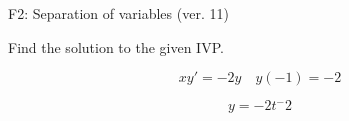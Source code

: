 \begin{exercise}
  \begin{exerciseTitle}F2: Separation of variables (ver. 11)\end{exerciseTitle}
  \begin{exerciseStatement}
    
Find the solution to the given IVP.

    
\[xy'= -2 y \hspace{1em} y( -1 ) = -2\]

  \end{exerciseStatement}
  \begin{exerciseAnswer}
    
\[y= -2 t^ -2\]

  \end{exerciseAnswer}
\end{exercise}